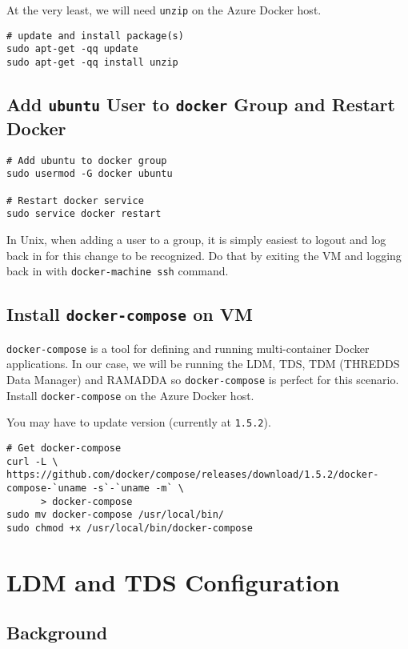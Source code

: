 \documentclass[11pt]{article}
\begin{document}
At the very least, we will need \texttt{unzip} on the Azure Docker host.
\begin{verbatim}
# update and install package(s)
sudo apt-get -qq update
sudo apt-get -qq install unzip
\end{verbatim}

\subsection{Add \texttt{ubuntu} User to \texttt{docker} Group and Restart Docker}
\label{sec:orgheadline9}

\begin{verbatim}
# Add ubuntu to docker group
sudo usermod -G docker ubuntu

# Restart docker service
sudo service docker restart
\end{verbatim}

In Unix, when adding a user to a group, it is simply easiest to logout and log back in for this change to be recognized. Do that by exiting the VM and logging back in with \texttt{docker-machine ssh} command.


\subsection{Install \texttt{docker-compose} on VM}
\label{sec:orgheadline10}

\texttt{docker-compose} is a tool for defining and running multi-container Docker applications. In our case, we will be running the LDM, TDS, TDM (THREDDS Data Manager) and RAMADDA so \texttt{docker-compose} is perfect for this scenario. Install \texttt{docker-compose} on the Azure Docker host.

You may have to update version (currently at \texttt{1.5.2}).

\begin{verbatim}
# Get docker-compose
curl -L \
https://github.com/docker/compose/releases/download/1.5.2/docker-compose-`uname -s`-`uname -m` \
      > docker-compose
sudo mv docker-compose /usr/local/bin/
sudo chmod +x /usr/local/bin/docker-compose
\end{verbatim}

\section{LDM and TDS Configuration}
\label{sec:orgheadline27}
\subsection{Background}
\label{sec:orgheadline14}
\end{document}
